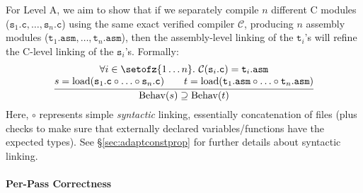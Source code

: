 For Level A, we aim to show that if we separately compile $n$
different C modules
($\mathtt{s}_1\mathtt{.c},\ldots,\mathtt{s}_n\mathtt{.c}$) using the
same exact verified compiler $\mathcal{C}$, producing $n$ assembly
modules
($\mathtt{t}_1\mathtt{.asm},\ldots,\mathtt{t}_n\mathtt{.asm}$), then
the assembly-level linking of the $\mathtt{t}_i$'s will refine the
C-level linking of the $\mathtt{s}_i$'s.  Formally:
\[
\frac{
\begin{array}{@{}c@{}}
\forall i\in\setofz{1\ldots n}.~\mathcal{C}(\mathtt{s}_i\mathtt{.c}) = \mathtt{t}_i\mathtt{.asm} \\
s = \mathrm{load}(\mathtt{s}_1\mathtt{.c}\circ \ldots \circ \mathtt{s}_n\mathtt{.c})\qquad
t = \mathrm{load}(\mathtt{t}_1\mathtt{.asm}\circ \ldots \circ \mathtt{t}_n\mathtt{.asm})
\end{array}
}
{\mathrm{Behav}(s) \supseteq \mathrm{Behav}(t)}
\]
Here, $\circ$ represents simple \emph{syntactic} linking, \ie
essentially concatenation of files (plus checks to make sure that
externally declared variables/functions have the expected types).  See
\S\ref{sec:adaptconstprop} for further details about syntactic
linking.

\newcommand{\mys}[1]{\mathtt{s}_{#1}}
\newcommand{\myt}[1]{\mathtt{t}_{#1}}

\paragraph{Per-Pass Correctness}

